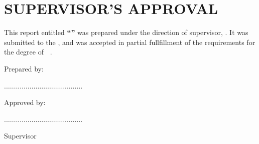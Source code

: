 \chapter{SUPERVISOR'S APPROVAL}

\makeatletter
This report entitled \textbf{``{\@title}''} was prepared under the direction of supervisor, {\@supervisor}. It was submitted to the {\@faculty}, and was accepted in partial fullfillment of the requirements for the degree of \textbf{\@programme~\@programmeT}.\par
\vspace{2cm}\par
\noindent Prepared by:\par
\vspace{2cm}\par
\noindent.$\dots\dots\dots\dots\dots\dots\dots\dots\dots\dots\dots\dots\dots$\par
\noindent{\@author}\par
\noindent{\@studentid}\par
\vspace{1cm}\par
\noindent Approved by:\par
\vspace{2cm}\par
\noindent.$\dots\dots\dots\dots\dots\dots\dots\dots\dots\dots\dots\dots\dots$\par
\noindent{\@supervisor}\par
\noindent Supervisor\par
\vspace{1cm}
\noindent\@datesubmit 
\makeatother
